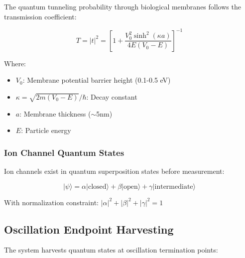 \documentclass[11pt,a4paper]{article}
\begin{document}
The quantum tunneling probability through biological membranes follows the transmission coefficient:

\begin{equation}
T = |t|^2 = \left[1 + \frac{V_0^2\sinh^2(\kappa a)}{4E(V_0-E)}\right]^{-1}
\end{equation}

Where:
\begin{itemize}
\item $V_0$: Membrane potential barrier height (0.1-0.5 eV)
\item $\kappa = \sqrt{2m(V_0-E)}/\hbar$: Decay constant
\item $a$: Membrane thickness ($\sim$5nm)
\item $E$: Particle energy
\end{itemize}

\subsubsection{Ion Channel Quantum States}

Ion channels exist in quantum superposition states before measurement:

\begin{equation}
|\psi\rangle = \alpha|\text{closed}\rangle + \beta|\text{open}\rangle + \gamma|\text{intermediate}\rangle
\end{equation}

With normalization constraint: $|\alpha|^2 + |\beta|^2 + |\gamma|^2 = 1$

\subsection{Oscillation Endpoint Harvesting}

The system harvests quantum states at oscillation termination points:
\end{document}
